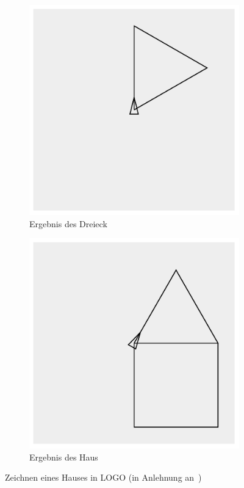 \begin{figure}
\begin{subfigure}[b]{0.3\textwidth}
        \includegraphics[width=\textwidth]{gfx/related-turtle-triangle.pdf}
        \caption{Ergebnis des Dreieck}
        \label{fig:related:turtle:triangle:result}
    \end{subfigure}\hfill
    \begin{subfigure}[b]{0.3\textwidth}
        \includegraphics[width=\textwidth]{gfx/related-turtle-house.pdf}
        \caption{Ergebnis des Haus}
        \label{fig:related:turtle:house:result}
    \end{subfigure}
    \caption{Zeichnen eines Hauses in LOGO (in Anlehnung an~\cite[14-15]{papert1980})}
    \label{fig:related:turtle:square}
\end{figure}

